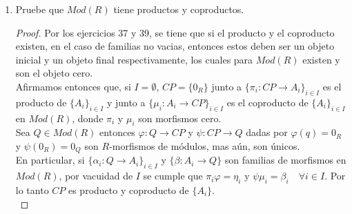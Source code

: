 \documentclass{article}
\begin{document}
\begin{enumerate}[label=\textbf{Ej \arabic*.}]
\begin{proof}
			Para la necesidad comencemos notando que $C$ también es un objeto de $\opst{\mathscr{C}}$. Sean $A$ y $\lrbrack{\catarrow{\opst{\gamma}_i}{A}{A_i}{}}_{\copyandpaste}$ en $\opst{\mathscr{C}}$, luego $A$ es un objeto de $\mathscr{C}$ y $\lrbrack{\catarrow{{\gamma}_i}{A_i}{A}{}}$ es una familia de morfismos en $\mathscr{C}$, con lo cual por la propiedad universal del coproducto $\exists !$ $\catarrow{\alpha}{C}{A}{}$ tal que $\forall\ i\in I$ $\gamma_i=\alpha\mu_i$ en $\mathscr{C}$. De modo que $\opst{\alpha}$ satisface que $\opst{\alpha}\in\ringmodhom{\opst{\mathscr{C}}}{A}{C}$ y $\forall\ \copyandpaste$ $\opst{\gamma}_i=\opst{\mu_i}\opst{\alpha}$. Finalmente, si suponemos que $\catarrow{\opst{\beta}}{A}{C}{}$ satisface que $\forall\ \copyandpaste$ $\opst{\gamma}_i=\opst{\mu_i}\opst{\beta}$, entonces $\beta\in\ringmodhom{\mathscr{C}}{C}{A}$ y $\forall\ \copyandpaste$ $\gamma=\beta\mu_i$. De esto último y la unicidad de $\alpha$ se sigue que ${\beta}={\alpha}$ en $\mathscr{C}$, y así  $\opst{\beta}=\opst{\alpha}$ en $\opst{\mathscr{C}}$, con lo cual se tiene lo dseeado.
			
			La suficiencia se verifica en forma análoga, puesto que tomar una familia de morfismos en la categoría $\mathscr{C}$ induce una familia de morfismos en $\opst{\mathscr{C}}$, empleando ahora la propiedad universal del producto.\\
		\end{proof}
\item Pruebe que $Mod(R)$ tiene productos y coproductos.
\begin{proof}
Por los ejercicios 37 y 39, se tiene que si el producto y el coproducto existen, en el caso de familias no vacias, entonces estos deben ser un objeto inicial y 
un objeto final respectivamente, los cuales para $Mod(R)$ existen y son el objeto cero.\\

Afirmamos entonces que, si $I=\emptyset$, $CP=\{0_R\}$ junto a $\{\pi_i:CP\to A_i\}_{i\in I}$ es el producto de $\{A_i\}_{i\in I}$ y 
 junto a $\{\mu_i:A_i\to CP\}_{i\in I}$ es el coproducto de $\{A_i\}_{i\in I}$ en $Mod(R)$, donde $\pi_i$ y $\mu_i$ son morfismos cero.\\

Sea $Q\in Mod(R)$ entonces $\varphi:Q\to CP$ y $\psi:CP\to Q$ dadas por 
$\varphi(q)=0_R$ y $\psi(0_R)=0_Q$ son $R$-morfismos de módulos, mas aún, son únicos.\\

En particular, si $\{\alpha_i:Q\to A_i\}_{i\in I}$ y $\{\beta:A_i\to Q\}$ son familias de morfismos en $Mod(R)$, por vacuidad de $I$ se cumple que 
$\pi_i\varphi=\eta_i$ y $\psi\mu_i=\beta_i\quad \forall i\in I$. Por lo tanto $CP$ es producto y coproducto de $\{A_i\}$.\\


\end{proof}
\end{enumerate}
\end{document}
